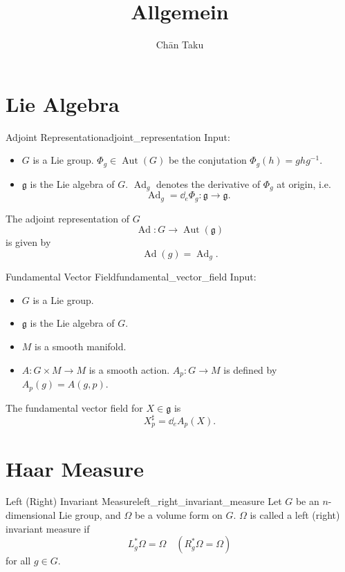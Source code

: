 \documentclass{article}
\title{Allgemein}
\author{Ch\=an Taku}
\begin{document}
\maketitle

\section{Lie Algebra}

\begin{definition}{Adjoint Representation}{adjoint_representation}
    Input:
    \begin{itemize}
        \item $G$ is a Lie group.
        $\Phi_g \in \operatorname{Aut}(G)$ be the conjutation $\Phi_g(h) = ghg^{-1}$.
        \item $\mathfrak{g}$ is the Lie algebra of $G$.
        $\operatorname{Ad}_g$ denotes the derivative of $\Phi_g$ at origin, i.e.
        \[ \operatorname{Ad}_g = \dd_e \Phi_g: \mathfrak{g} \rightarrow \mathfrak{g}. \]
    \end{itemize}
    The adjoint representation of $G$
    \[ \operatorname{Ad}: G \rightarrow \operatorname{Aut}(\mathfrak{g}) \]
    is given by
    \[ \operatorname{Ad}(g) = \operatorname{Ad}_g. \]
\end{definition}

\begin{definition}{Fundamental Vector Field}{fundamental_vector_field}
    Input:
    \begin{itemize}
        \item $G$ is a Lie group.
        \item $\mathfrak{g}$ is the Lie algebra of $G$.
        \item $M$ is a smooth manifold.
        \item $A: G\times M \rightarrow M$ is a smooth action.
        $A_p: G\rightarrow M$ is defined by $A_p(g) = A(g, p)$.
    \end{itemize}
    The fundamental vector field for $X\in \mathfrak{g}$ is
    \[ X^\sharp_p = \dd_e A_p(X). \]
\end{definition}

\section{Haar Measure}

\begin{definition}{Left (Right) Invariant Measure}{left_right_invariant_measure}
    Let $G$ be an $n$-dimensional Lie group, and $\Omega$ be a volume form on $G$.
    $\Omega$ is called a left (right) invariant measure if
    \[ L_g^* \Omega = \Omega \quad (R_g^* \Omega = \Omega) \]
    for all $g\in G$.
\end{definition}
\end{document}
